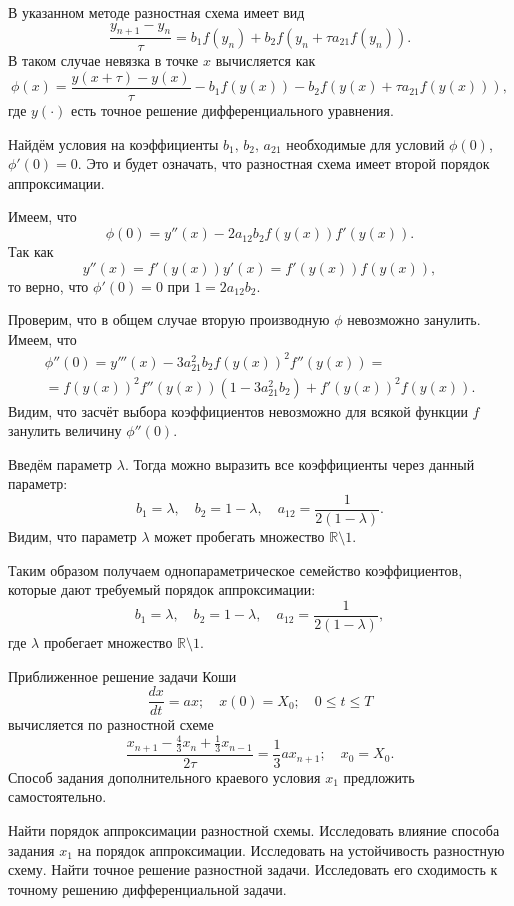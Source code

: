 \documentclass[a4paper]{article}
\begin{document}
\begin{sol}
В указанном методе разностная схема имеет вид
\[
	\frac{y_{n+1}-y_n}{\tau}=b_1 f(y_n)+b_2 f\left( y_n+
	\tau a_{21} f(y_n)\right) 
.\] 
В таком случае невязка в точке $x$ вычисляется как
\[
	\phi(x)= \frac{y(x+\tau)-y(x)}{\tau} - b_1 f\left( 
	y(x)\right) -b_2 f\left( y(x)+\tau a_{21} f\left( y(x) \right)  \right) 
 ,\] 
 где $y(\cdot)$ есть точное решение дифференциального уравнения.

Найдём условия на коэффициенты $b_1,\,b_2,\,a_{21}$ необходимые
для условий $\phi(0)$, $\phi'(0)=0$. Это и будет означать, что
 разностная схема имеет второй порядок аппроксимации.

Имеем, что
\[
	\phi(0)= y''(x)-2 a_{12} b_2 f(y(x))f'(y(x))
.\] 
Так как 
\[
	y''(x)= f'(y(x))y'(x)=f'(y(x))f(y(x))
 ,\] 
 то верно, что $\phi'(0)=0$ при $1= 2 a_{12} b_2$.

Проверим, что в общем случае вторую производную $\phi$ 
невозможно занулить. Имеем, что  
\begin{multline*}
	\phi''(0)= y'''(x)- 3a_{21}^2 b_2 f(y(x))^2f''(y(x))=
\\=	f(y(x))^2 f''(y(x))(1-3a_{21}^2b_2)+f'(y(x))^2f(y(x))
.\end{multline*} 
Видим, что засчёт выбора коэффициентов невозможно для всякой
функции $f$ занулить величину $\phi''(0)$.

Введём параметр $\lambda$. Тогда можно выразить все коэффициенты
через данный параметр:
\[
	b_1=\lambda,\quad b_2=1-\lambda,\quad a_{12}=\frac{1}{2(1-\lambda)}
.\] 
Видим, что параметр $\lambda$ может пробегать множество $\mathbb{R}\setminus {1}$.

Таким образом получаем однопараметрическое семейство
коэффициентов, которые дают требуемый порядок аппроксимации:
\[
	b_1=\lambda,\quad b_2=1-\lambda,\quad a_{12}=\frac{1}{2(1-\lambda)}
,\]
где $\lambda$ пробегает множество $\mathbb{R} \setminus {1}$.
\end{sol}
\begin{hiProb}[9.7-2]
Приближенное решение задачи Коши
\[
	\frac{dx}{dt}=ax;\quad x(0)=X_0;\quad 0\le t\le T
\]
вычисляется по разностной схеме
\[
\frac{x_{n+1}-\frac{4}{3}x_n+ \frac{1}{3}x_{n-1}}{2\tau}=\frac{1}{3}
ax_{n+1};\quad x_0=X_0
.\] 
Способ задания дополнительного краевого условия $x_1$ предложить
самостоятельно.

Найти порядок аппроксимации разностной схемы. Исследовать влияние способа
 задания $x_1$ на порядок аппроксимации. Исследовать на
устойчивость разностную схему. Найти точное решение разностной
задачи. Исследовать его сходимость к точному решению
дифференциальной задачи.
\end{hiProb}
\end{document}
